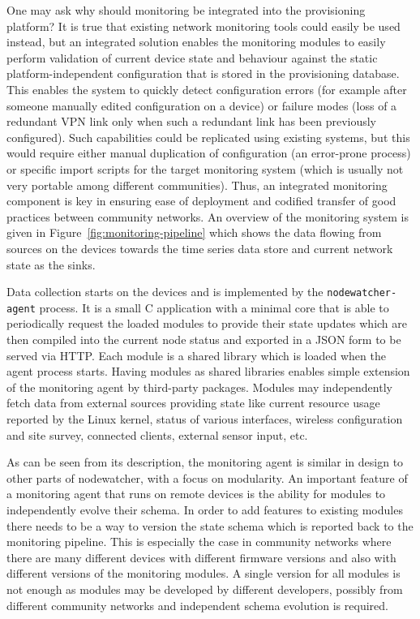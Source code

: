 \documentclass[5p,sort&compress]{elsarticle}
\begin{document}
One may ask why should monitoring be integrated into the provisioning platform?
It is true that existing network monitoring tools could easily be used instead, but an integrated solution enables the monitoring modules to easily perform validation of current device state and behaviour against the static platform-independent configuration that is stored in the provisioning database.
This enables the system to quickly detect configuration errors (for example after someone manually edited configuration on a device) or failure modes (loss of a redundant VPN link only when such a redundant link has been previously configured).
Such capabilities could be replicated using existing systems, but this would require either manual duplication of configuration (an error-prone process) or specific import scripts for the target monitoring system (which is usually not very portable among different communities).
Thus, an integrated monitoring component is key in ensuring ease of deployment and codified transfer of good practices between community networks.
An overview of the monitoring system is given in Figure~\ref{fig:monitoring-pipeline} which shows the data flowing from sources on the devices towards the time series data store and current network state as the sinks.

Data collection starts on the devices and is implemented by the \texttt{nodewatcher-agent} process.
It is a small C application with a minimal core that is able to periodically request the loaded modules to provide their state updates which are then compiled into the current node status and exported in a JSON form to be served via HTTP.
Each module is a shared library which is loaded when the agent process starts.
Having modules as shared libraries enables simple extension of the monitoring agent by third-party packages.
Modules may independently fetch data from external sources providing state like current resource usage reported by the Linux kernel, status of various interfaces, wireless configuration and site survey, connected clients, external sensor input, etc.

As can be seen from its description, the monitoring agent is similar in design to other parts of nodewatcher, with a focus on modularity.
An important feature of a monitoring agent that runs on remote devices is the ability for modules to independently evolve their schema.
In order to add features to existing modules there needs to be a way to version the state schema which is reported back to the monitoring pipeline.
This is especially the case in community networks where there are many different devices with different firmware versions and also with different versions of the monitoring modules.
A single version for all modules is not enough as modules may be developed by different developers, possibly from different community networks and independent schema evolution is required.
\end{document}
